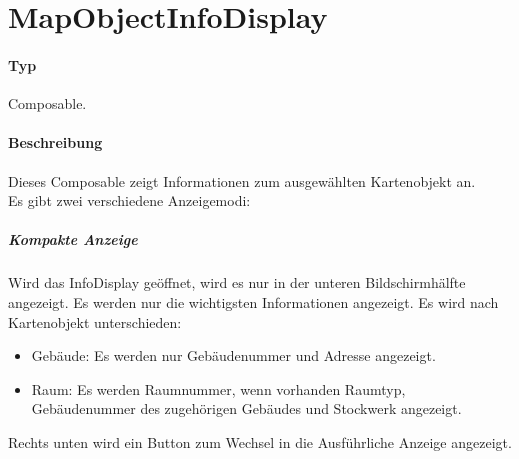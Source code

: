 \section{MapObjectInfoDisplay}
\paragraph*{Typ}
Composable.
\paragraph*{Beschreibung}
Dieses Composable zeigt Informationen zum ausgewählten Kartenobjekt an.\\
Es gibt zwei verschiedene Anzeigemodi:

\subparagraph*{Kompakte Anzeige}
Wird das InfoDisplay geöffnet, wird es nur in der unteren Bildschirmhälfte angezeigt. 
Es werden nur die wichtigsten Informationen angezeigt. Es wird nach Kartenobjekt unterschieden:
\begin{itemize}
    \item Gebäude: Es werden nur Gebäudenummer und Adresse angezeigt.
    \item Raum: Es werden Raumnummer, wenn vorhanden Raumtyp, Gebäudenummer des zugehörigen Gebäudes und Stockwerk angezeigt.
\end{itemize}
Rechts unten wird ein Button zum Wechsel in die Ausführliche Anzeige angezeigt.

